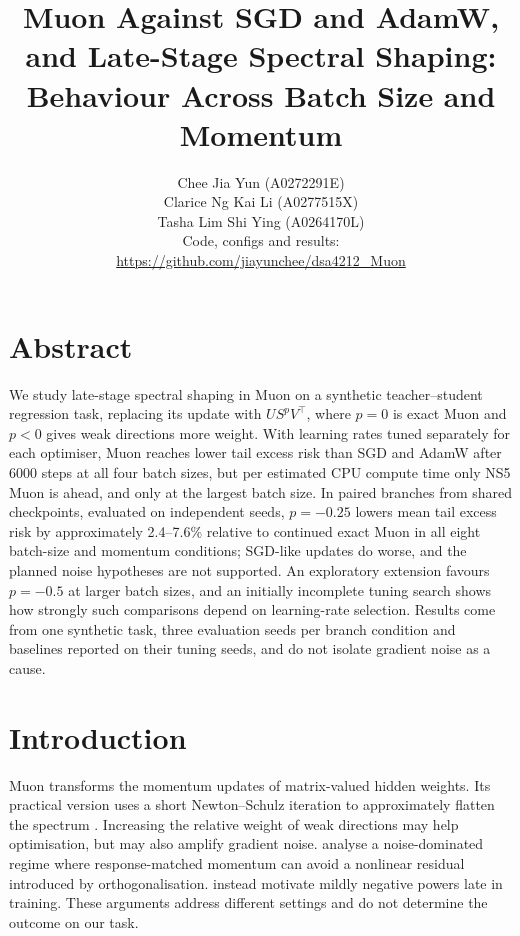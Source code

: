 \documentclass[11pt,a4paper]{article}
\title{Muon Against SGD and AdamW, and Late-Stage Spectral Shaping: Behaviour Across Batch Size and Momentum}  %
\author{%
  Chee Jia Yun (A0272291E)\\
  Clarice Ng Kai Li (A0277515X)\\
  Tasha Lim Shi Ying (A0264170L)\\[6pt]
  \normalsize Code, configs and results:\\
  \normalsize \url{https://github.com/jiayunchee/dsa4212_Muon}}
\date{}  %
\begin{document}
\maketitle
\RaggedRight

\section*{Abstract}
\noindent
We study late-stage spectral shaping in Muon on a synthetic teacher--student regression task, replacing its update with $US^pV^\top$, where $p=0$ is exact Muon and $p<0$ gives weak directions more weight. With learning rates tuned separately for each optimiser, Muon reaches lower tail excess risk than SGD and AdamW after 6000 steps at all four batch sizes, but per estimated CPU compute time only NS5 Muon is ahead, and only at the largest batch size. In paired branches from shared checkpoints, evaluated on independent seeds, $p=-0.25$ lowers mean tail excess risk by approximately 2.4--7.6\% relative to continued exact Muon in all eight batch-size and momentum conditions; SGD-like updates do worse, and the planned noise hypotheses are not supported. An exploratory extension favours $p=-0.5$ at larger batch sizes, and an initially incomplete tuning search shows how strongly such comparisons depend on learning-rate selection. Results come from one synthetic task, three evaluation seeds per branch condition and baselines reported on their tuning seeds, and do not isolate gradient noise as a cause.


\section{Introduction}\label{sec:intro}
Muon transforms the momentum updates of matrix-valued hidden weights. Its practical version uses a short Newton--Schulz iteration to approximately flatten the spectrum \citep{jordan2024muon}. Increasing the relative weight of weak directions may help optimisation, but may also amplify gradient noise. \citet{xie2026noise} analyse a noise-dominated regime where response-matched momentum can avoid a nonlinear residual introduced by orthogonalisation. \citet{wu2026dynmuon} instead motivate mildly negative powers late in training. These arguments address different settings and do not determine the outcome on our task.
\end{document}

